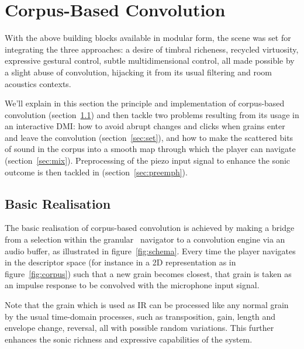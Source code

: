 \section{Corpus-Based Convolution} %

With the above building blocks available in modular form, the scene was set for integrating the three approaches: a desire of timbral richeness, recycled virtuosity, expressive gestural control, subtle multidimensional control, all made possible by a slight abuse of convolution, hijacking it from its usual filtering and room acoustics contexts.

We'll explain in this section the principle and implementation of corpus-based convolution (section~\ref{sec:basic}) and then tackle two problems resulting from its usage in an interactive DMI: 
how to avoid abrupt changes and clicks when grains enter and leave the convolution (section~\ref{sec:set}), and
how to make the scattered bits of sound in the corpus into a smooth map through which the player can navigate (section~\ref{sec:mix}). Preprocessing of the piezo input signal to enhance the sonic outcome is then tackled in (section~\ref{sec:preemph}).

\subsection{Basic Realisation}\label{sec:basic}


The basic realisation of corpus-based convolution is achieved by making a bridge from a selection within the granular \cbcs\ navigator to a convolution engine via an audio buffer, as illustrated in figure~\ref{fig:schema}.  Every time the player navigates in the descriptor space (for instance in a 2D representation as in figure~\ref{fig:corpus}) such that a new grain becomes closest, that grain is taken as an impulse response to be convolved with the microphone input signal.

Note that the grain which is used as IR can be processed like any normal grain by the usual time-domain processes, such as transposition, gain, length and envelope change, reversal, all with possible random variations. This further enhances the sonic richness and expressive capabilities of the system.


